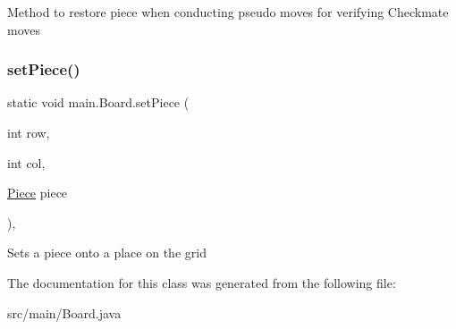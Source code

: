 Method to restore piece when conducting \textquotesingle{}pseudo moves\textquotesingle{} for verifying Checkmate moves \mbox{\label{classmain_1_1_board_a215b7bab76f16b1c638bae367a5eed35}} 
\subsubsection{\texorpdfstring{set\+Piece()}{setPiece()}}
{\footnotesize\ttfamily static void main.\+Board.\+set\+Piece (\begin{DoxyParamCaption}\item[{int}]{row,  }\item[{int}]{col,  }\item[{\hyperlink{classmain_1_1pieces_1_1_piece}{Piece}}]{piece }\end{DoxyParamCaption})\hspace{0.3cm}{\ttfamily [inline]}, {\ttfamily [static]}}

Sets a piece onto a place on the grid 

The documentation for this class was generated from the following file\+:\begin{DoxyCompactItemize}
\item 
src/main/Board.\+java\end{DoxyCompactItemize}
